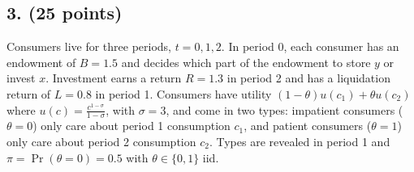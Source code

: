 \documentclass[12pt]{article}
\begin{document}
\subsection*{3. (25 points)}

Consumers live for three periods, $t = 0, 1, 2$. In period 0, each consumer has an endowment of $B = 1.5$ and decides which part of the endowment to store $y$ or invest $x$. Investment earns a return $R = 1.3$ in period 2 and has a liquidation return of $L = 0.8$ in period 1. Consumers have utility $(1-\theta)u(c_1)+\theta u(c_2)$ where $u(c) = \frac{c^{1-\sigma}}{1-\sigma}$, with $\sigma = 3$, and come in two types: impatient consumers ($\theta = 0$) only care about period 1 consumption $c_1$, and patient consumers ($\theta = 1$) only care about period 2 consumption $c_2$. Types are revealed in period 1 and $\pi = \Pr(\theta = 0) = 0.5$ with $\theta \in \{0, 1\}$ iid.
\end{document}
